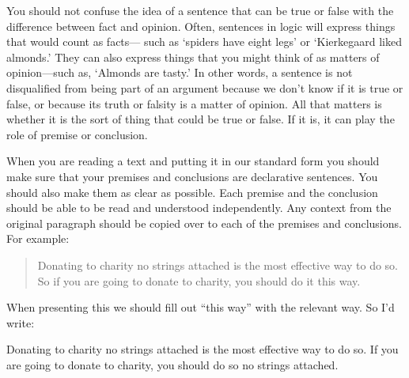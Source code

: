 You should not confuse the idea of a sentence that can be true or false with the difference between fact and opinion. Often, sentences in logic will express things that would count as facts--- such as `spiders have eight legs' or `Kierkegaard liked almonds.' They can also express things that you might think of as matters of opinion---such as, `Almonds are tasty.' In other words, a sentence is not disqualified from being part of an argument because we don't know if it is true or false, or because its truth or falsity is a matter of opinion. All that matters is whether it is the sort of thing that could be true or false. If it is, it can play the role of premise or conclusion.

When you are reading a text and putting it in our standard form you should make sure that your premises and conclusions are declarative sentences.
You should also make them as clear as possible. Each premise and the conclusion should be able to be read and understood independently. Any context from the original paragraph should be copied over to each of the premises and conclusions.
For example:
\begin{quote}
Donating to charity no strings attached is the most effective way to do so. So if you are going to donate to charity, you should do it this way.
\end{quote}
When presenting this we should fill out ``this way'' with the relevant way. So I'd write:
\begin{earg}
\prem	Donating to charity no strings attached is the most effective way to do so.
\conc  If you are going to donate to charity, you should do so no strings attached.
\end{earg}






